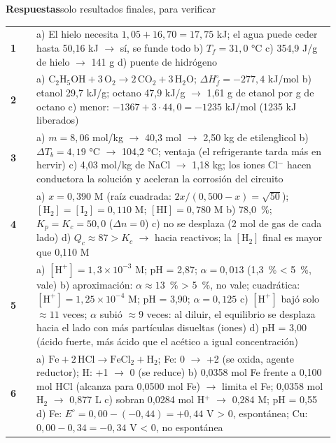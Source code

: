\documentclass[11pt]{article}
\begin{document}
\newpage
{\Large\bfseries Respuestas}\hfill{\small\color{gray}solo resultados finales, para verificar}\par
\vspace{2pt}{\color{NavyBlue}\rule{\linewidth}{0.8pt}}\par\vspace{6pt}
\renewcommand{\arraystretch}{1.5}
\begin{tabular}{@{}>{\bfseries\color{NavyBlue}}l >{\raggedright\arraybackslash}p{0.92\linewidth}@{}}
1 & a) El hielo necesita \(1{,}05 + 16{,}70 = 17{,}75\) kJ; el agua puede ceder hasta 50,16 kJ \(\rightarrow\) sí, se funde todo \quad b) \(T_f = 31{,}0\) °C \quad c) 354,9 J/g de hielo \(\rightarrow\) 141 g \quad d) puente de hidrógeno\\
2 & a) \(\text{C}_2\text{H}_5\text{OH} + 3\,\text{O}_2 \rightarrow 2\,\text{CO}_2 + 3\,\text{H}_2\text{O}\); \(\Delta H^\circ_f = -277{,}4\) kJ/mol \quad b) etanol 29,7 kJ/g; octano 47,9 kJ/g \(\rightarrow\) 1,61 g de etanol por g de octano \quad c) menor: \(-1367 + 3\cdot 44{,}0 = -1235\) kJ/mol (1235 kJ liberados)\\
3 & a) \(m = 8{,}06\) mol/kg \(\rightarrow\) 40,3 mol \(\rightarrow\) 2,50 kg de etilenglicol \quad b) \(\Delta T_b = 4{,}19\) °C \(\rightarrow\) 104,2 °C; ventaja (el refrigerante tarda más en hervir) \quad c) 4,03 mol/kg de NaCl \(\rightarrow\) 1,18 kg; los iones Cl\(^-\) hacen conductora la solución y aceleran la corrosión del circuito\\
4 & a) \(x = 0{,}390\) M (raíz cuadrada: \(2x/(0{,}500 - x) = \sqrt{50}\)); \([\text{H}_2] = [\text{I}_2] = 0{,}110\) M; \([\text{HI}] = 0{,}780\) M \quad b) 78,0~\%; \(K_p = K_c = 50{,}0\) (\(\Delta n = 0\)) \quad c) no se desplaza (2 mol de gas de cada lado) \quad d) \(Q_c \approx 87 > K_c\) \(\rightarrow\) hacia reactivos; la \([\text{H}_2]\) final es mayor que 0,110 M\\
5 & a) \([\text{H}^+] = 1{,}3\times10^{-3}\) M; pH = 2,87; \(\alpha = 0{,}013\) (1,3~\% < 5~\%, vale) \quad b) aproximación: \(\alpha \approx 13\)~\% > 5~\%, no vale; cuadrática: \([\text{H}^+] = 1{,}25\times10^{-4}\) M; pH = 3,90; \(\alpha = 0{,}125\) \quad c) \([\text{H}^+]\) bajó solo \(\approx 11\) veces; \(\alpha\) subió \(\approx 9\) veces: al diluir, el equilibrio se desplaza hacia el lado con más partículas disueltas (iones) \quad d) pH = 3,00 (ácido fuerte, más ácido que el acético a igual concentración)\\
6 & a) \(\text{Fe} + 2\,\text{HCl} \rightarrow \text{FeCl}_2 + \text{H}_2\); Fe: 0 \(\rightarrow\) +2 (se oxida, agente reductor); H: +1 \(\rightarrow\) 0 (se reduce) \quad b) 0,0358 mol Fe frente a 0,100 mol HCl (alcanza para 0,0500 mol Fe) \(\rightarrow\) limita el Fe; 0,0358 mol H\(_2\) \(\rightarrow\) 0,877 L \quad c) sobran 0,0284 mol H\(^+\) \(\rightarrow\) 0,284 M; pH = 0,55 \quad d) Fe: \(E^\circ = 0{,}00 - (-0{,}44) = +0{,}44\) V > 0, espontánea; Cu: \(0{,}00 - 0{,}34 = -0{,}34\) V < 0, no espontánea\\

\end{tabular}
\end{document}

